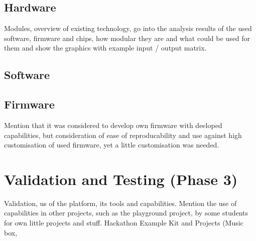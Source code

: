 \subsection{\label{sec:methods_hw}Hardware}
Modules, overview of existing technology, go into the analysis results of the used software, firmware and chips, how modular they are and what could be used for them and show the graphics with example input / output matrix.

\subsection{\label{sec:methods_sw}Software}


\subsection{\label{sec:methods_fw}Firmware}
Mention that it was considered to develop own firmware with deeloped capabilities, but consideration of ease of reproducability and use against high customisation of used firmware, yet a little customisation was needed.


\section{\label{sec:methods_exp_p3}Validation and Testing (Phase 3)}
Validation, us of the platform, its tools and capabilities.
Mention the use of capabilities in other projects, such as the playground project, by some students for own little projects and stuff.
Hackathon
Example Kit and Projects (Music box, 



